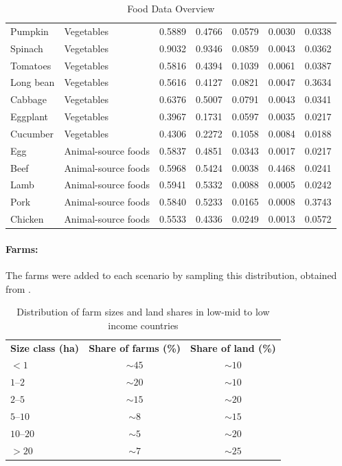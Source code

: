 \documentclass{oqireport}
\begin{document}
\begin{table}[ht]
\begin{tabular}{llrrrrr}
Pumpkin        & Vegetables            & 0.5889 & 0.4766 & 0.0579 & 0.0030 & 0.0338 \\
Spinach        & Vegetables            & 0.9032 & 0.9346 & 0.0859 & 0.0043 & 0.0362 \\
Tomatoes       & Vegetables            & 0.5816 & 0.4394 & 0.1039 & 0.0061 & 0.0387 \\
Long bean      & Vegetables            & 0.5616 & 0.4127 & 0.0821 & 0.0047 & 0.3634 \\
Cabbage        & Vegetables            & 0.6376 & 0.5007 & 0.0791 & 0.0043 & 0.0341 \\
Eggplant       & Vegetables            & 0.3967 & 0.1731 & 0.0597 & 0.0035 & 0.0217 \\
Cucumber       & Vegetables            & 0.4306 & 0.2272 & 0.1058 & 0.0084 & 0.0188 \\
Egg            & Animal-source foods   & 0.5837 & 0.4851 & 0.0343 & 0.0017 & 0.0217 \\
Beef           & Animal-source foods   & 0.5968 & 0.5424 & 0.0038 & 0.4468 & 0.0241 \\
Lamb           & Animal-source foods   & 0.5941 & 0.5332 & 0.0088 & 0.0005 & 0.0242 \\
Pork           & Animal-source foods   & 0.5840 & 0.5233 & 0.0165 & 0.0008 & 0.3743 \\
Chicken        & Animal-source foods   & 0.5533 & 0.4336 & 0.0249 & 0.0013 & 0.0572 \\

\end{tabular}
\caption{Food Data Overview}
\end{table}

\newpage
\paragraph{Farms:}

The farms were added to each scenario by sampling this distribution, obtained from \cite{LOWDER201616}.

\begin{table}[h!]
\centering

\begin{tabular}{lcc}

\textbf{Size class (ha)} & \textbf{Share of farms (\%)} & \textbf{Share of land (\%)} \\

$<1$        & $\sim 45$ & $\sim 10$ \\
$1$--$2$    & $\sim 20$ & $\sim 10$ \\
$2$--$5$    & $\sim 15$ & $\sim 20$ \\
$5$--$10$   & $\sim 8$  & $\sim 15$ \\
$10$--$20$  & $\sim 5$  & $\sim 20$ \\
$>20$       & $\sim 7$  & $\sim 25$ \\

\end{tabular}
\caption{Distribution of farm sizes and land shares in low-mid to low income countries}
\label{tab:farm_size_distribution}
\end{table}
\end{document}

